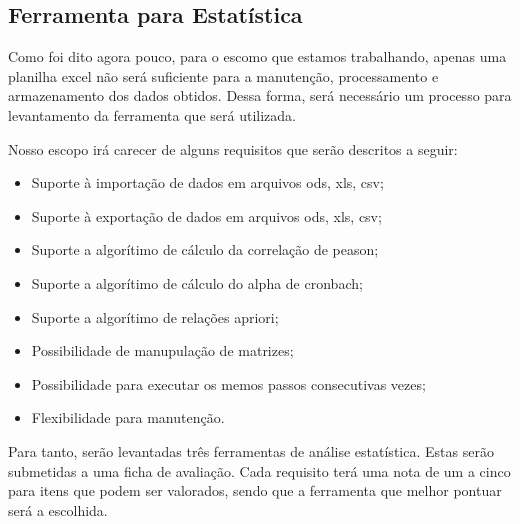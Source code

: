 \subsection{Ferramenta para Estatística}
\label{sub:ferramenta_para_estat_stica}
Como foi dito agora pouco, para o escomo que estamos trabalhando, apenas uma planilha excel não será suficiente
para a manutenção, processamento e armazenamento dos dados obtidos. Dessa forma, será  necessário um processo
para levantamento da ferramenta que será utilizada.

Nosso escopo irá carecer de alguns requisitos que serão descritos a seguir:

\begin{itemize}
    \item Suporte à importação de dados em arquivos ods, xls, csv;
    \item Suporte à exportação de dados em arquivos ods, xls, csv;
    \item Suporte a algorítimo de cálculo da correlação de peason;
    \item Suporte a algorítimo de cálculo do alpha de cronbach;
    \item Suporte a algorítimo de relações apriori;
    \item Possibilidade de manupulação de matrizes;
    \item Possibilidade para executar os memos passos consecutivas vezes;
    \item Flexibilidade para manutenção.
\end{itemize}

Para tanto, serão levantadas três ferramentas de análise estatística. Estas serão submetidas a uma ficha de avaliação.
Cada requisito terá uma nota de um a cinco para itens que podem ser valorados, sendo que a ferramenta que melhor pontuar será a escolhida.


